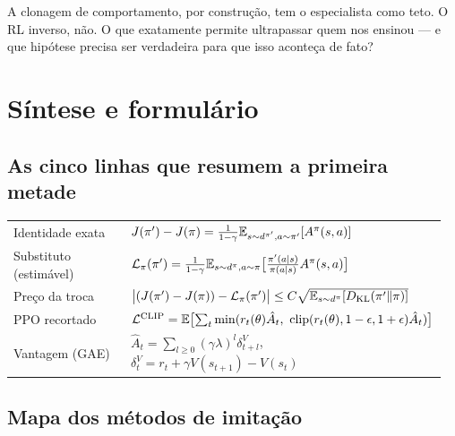 \documentclass[11pt]{article}
\newcommand{\thv}{\theta}
\newcommand{\polnovo}{\pol'}
\newcommand{\Ahat}{\hat{A}}
\newcommand{\Advpi}{A^{\pol}}
\newcommand{\Dkl}{D_{\mathrm{KL}}}
\newcommand{\dpi}{d^{\pol}}
\newcommand{\Lsub}[1]{\mathcal{L}_{#1}}
\DeclareMathOperator{\clip}{clip}
\newcommand{\razao}{r_t(\thv)}
\newcommand{\Lclip}{\mathcal{L}^{\mathrm{CLIP}}}
\begin{document}
\begin{discbox}
  A clonagem de comportamento, por construção, tem o especialista como teto. O RL
  inverso, não. O que exatamente permite ultrapassar quem nos ensinou --- e que hipótese
  precisa ser verdadeira para que isso aconteça de fato?
\end{discbox}

\section{Síntese e formulário}

\subsection{As cinco linhas que resumem a primeira metade}

\begin{center}\small
\begin{tabular}{@{}>{\raggedright\arraybackslash}p{0.30\linewidth}
                 >{\raggedright\arraybackslash}p{0.66\linewidth}@{}}
\toprule
Identidade exata &
  $J(\polnovo)-J(\pol) = \frac{1}{1-\gamma}\E_{s\sim d^{\polnovo}, a\sim\polnovo}[\Advpi(s,a)]$ \\[0.4em]
Substituto (estimável) &
  $\Lsub{\pol}(\polnovo) = \frac{1}{1-\gamma}\E_{s\sim\dpi,a\sim\pol}\bigl[\frac{\polnovo(a\mid s)}{\pol(a\mid s)}\Advpi(s,a)\bigr]$ \\[0.4em]
Preço da troca &
  $\bigl|(J(\polnovo)-J(\pol)) - \Lsub{\pol}(\polnovo)\bigr| \le C\sqrt{\E_{s\sim\dpi}[\Dkl(\polnovo\|\pol)]}$ \\[0.4em]
PPO recortado &
  $\Lclip = \E\bigl[\sum_t \min(\razao\Ahat_t,\ \clip(\razao,1-\epsilon,1+\epsilon)\Ahat_t)\bigr]$ \\[0.4em]
Vantagem (GAE) &
  $\Ahat_t = \sum_{l\ge0}(\gamma\lambda)^l\delta^V_{t+l}$, \quad
  $\delta^V_t = r_t + \gamma V(s_{t+1}) - V(s_t)$ \\
\bottomrule
\end{tabular}
\end{center}

\subsection{Mapa dos métodos de imitação}
\end{document}
